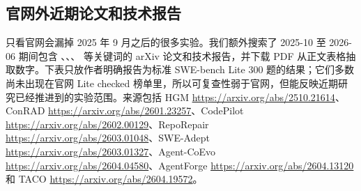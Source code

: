 \documentclass[UTF8,a4paper,11pt]{ctexart}
\begin{document}
\subsection{官网外近期论文和技术报告}

只看官网会漏掉 2025 年 9 月之后的很多实验。我们额外搜索了 2025-10 至 2026-06 期间包含 、、、 等关键词的 arXiv 论文和技术报告，并下载 PDF 从正文表格抽取数字。下表只放作者明确报告为标准 SWE-bench Lite 300 题的结果；它们多数尚未出现在官网 Lite checked 榜单里，所以可复查性弱于官网，但能反映近期研究已经推进到的实验范围。来源包括 HGM \url{https://arxiv.org/abs/2510.21614}、ConRAD \url{https://arxiv.org/abs/2601.23257}、CodePilot \url{https://arxiv.org/abs/2602.00129}、RepoRepair \url{https://arxiv.org/abs/2603.01048}、SWE-Adept \url{https://arxiv.org/abs/2603.01327}、Agent-CoEvo \url{https://arxiv.org/abs/2604.04580}、AgentForge \url{https://arxiv.org/abs/2604.13120} 和 TACO \url{https://arxiv.org/abs/2604.19572}。
\end{document}

